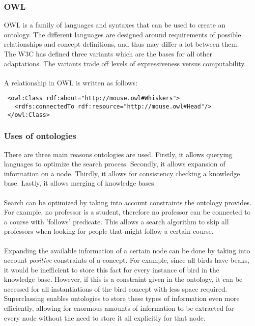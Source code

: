 \documentclass{article}
\begin{document}
 
 \subsubsection{OWL}
 OWL is a family of languages and syntaxes that can be used to create an ontology. The different languages are designed around requirements of possible relationships and concept definitions, and thus may differ a lot between them. The W3C has defined three variants which are the bases for all other adaptations. The variants trade off levels of expressiveness versus computability.
 \paragraph{}
 A relationship in OWL is written as follows:
 
 \lstset{language=XML}
 \begin{lstlisting}
 <owl:Class rdf:about="http://mouse.owl#Whiskers">
   <rdfs:connectedTo rdf:resource="http://mouse.owl#Head"/>
 </owl:Class>
 \end{lstlisting}
 
 \subsubsection{Uses of ontologies}
 There are three main reasons ontologies are used. Firstly, it allows querying languages to optimize the search process. Secondly, it allows expansion of information on a node. Thirdly, it allows for consistency checking a knowledge base. Lastly, it allows merging of knowledge bases.
 \paragraph{}
 Search can be optimized by taking into account constraints the ontology provides. For example, no professor is a student, therefore no professor can be connected to a course with 'follows' predicate. This allows a search algorithm to skip all professors when looking for people that might follow a certain course.
 \paragraph{}
 Expanding the available information of a certain node can be done by taking into account \textit{positive} constraints of a concept. For example, since all birds have beaks, it would be inefficient to store this fact for every instance of bird in the knowledge base. However, if this is a constraint given in the ontology, it can be accessed for all instantiations of the bird concept with less space required. Superclassing enables ontologies to store these types of information even more efficiently, allowing for enormous amounts of information to be extracted for every node without the need to store it all explicitly for that node.
\end{document}
